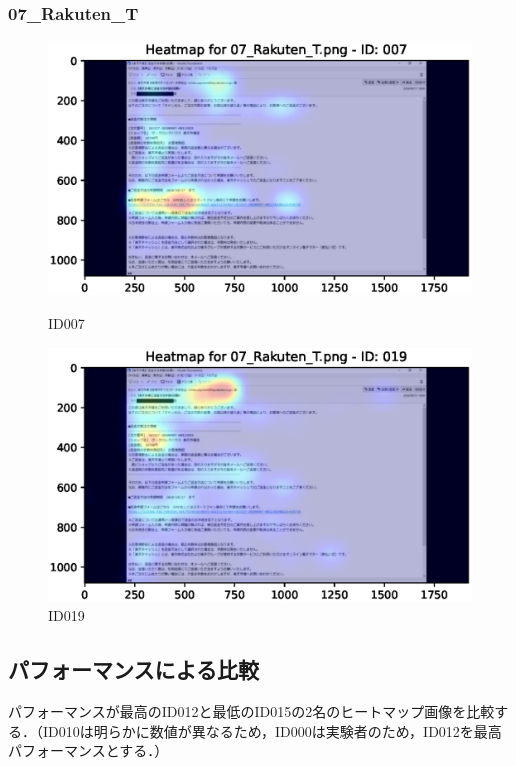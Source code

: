 \documentclass[a4paper,11pt]{ltjsreport}
\begin{document}
\subsubsection{07\_Rakuten\_T}
\begin{figure}[H]
	\centering
	\begin{minipage}[b]{0.49\textwidth}
		\centering
		\includegraphics[width=\linewidth]{img/output/ID007_heatmap_07_Rakuten_T.eps}
		\caption{ID007\label{fig:07007}}
	\end{minipage}
	\begin{minipage}[b]{0.49\textwidth}
		\centering
		\includegraphics[width=\linewidth]{img/output/ID019_heatmap_07_Rakuten_T.eps}
		\caption{ID019\label{fig:07019}}
	\end{minipage}
\end{figure}

\clearpage
\subsection{パフォーマンスによる比較}
\label{sec:heat}
パフォーマンスが最高のID012と最低のID015の2名のヒートマップ画像を比較する．（ID010は明らかに数値が異なるため，ID000は実験者のため，ID012を最高パフォーマンスとする．）
\end{document}
